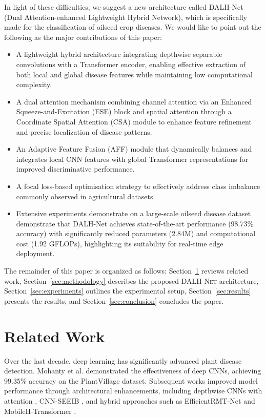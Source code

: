 \documentclass[default, iicol]{sn-jnl}
\theoremstyle{thmstyleone}%
\theoremstyle{thmstyletwo}%
\theoremstyle{thmstylethree}%
\newcommand{\dalh}{\textsc{DALH-Net}}
\begin{document}
In light of these difficulties, we suggest a new architecture called DALH-Net (Dual Attention-enhanced Lightweight Hybrid Network), which is specifically made for the classification of oilseed crop diseases. We would like to point out the following as the major contributions of this paper:

\begin{itemize}

\item A lightweight hybrid architecture integrating depthwise separable convolutions with a Transformer encoder, enabling effective extraction of both local and global disease features while maintaining low computational complexity.

\item A dual attention mechanism combining channel attention via an Enhanced Squeeze-and-Excitation (ESE) block and spatial attention through a Coordinate Spatial Attention (CSA) module to enhance feature refinement and precise localization of disease patterns.

\item An Adaptive Feature Fusion (AFF) module that dynamically balances and integrates local CNN features with global Transformer representations for improved discriminative performance.

\item A focal loss-based optimisation strategy to effectively address class imbalance commonly observed in agricultural datasets.

\item Extensive experiments demonstrate on a large-scale oilseed disease dataset demonstrate that DALH-Net achieves state-of-the-art performance (98.73\% accuracy) with significantly reduced parameters (2.84M) and computational cost (1.92 GFLOPs), highlighting its suitability for real-time edge deployment.

\end{itemize}
The remainder of this paper is organized as follows: Section~\ref{sec:related} reviews related work, Section~\ref{sec:methodology} describes the proposed \dalh{} architecture, Section~\ref{sec:experiments} outlines the experimental setup, Section~\ref{sec:results} presents the results, and Section~\ref{sec:conclusion} concludes the paper.
\section{Related Work}\label{sec:related}

Over the last decade, deep learning has significantly advanced plant disease detection. Mohanty et al. \cite{mohanty2016using} demonstrated the effectiveness of deep CNNs, achieving 99.35\% accuracy on the PlantVillage dataset. Subsequent works improved model performance through architectural enhancements, including depthwise CNNs with attention \cite{ashurov2025enhancing}, CNN-SEEIB \cite{karthikeyan2025enhanced}, and hybrid approaches such as EfficientRMT-Net \cite{shaheed2023efficientrmtnet} and MobileH-Transformer \cite{thai2025mobileh}.
\end{document}
